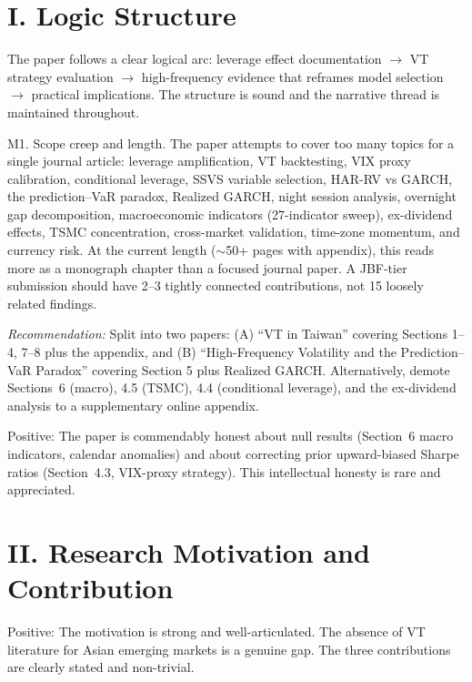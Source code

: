 \documentclass[12pt,a4paper]{article}
\begin{document}
\section*{I. Logic Structure}

The paper follows a clear logical arc: leverage effect documentation $\to$ VT strategy evaluation $\to$ high-frequency evidence that reframes model selection $\to$ practical implications. The structure is sound and the narrative thread is maintained throughout.

\textcolor{warncolor}{M1. Scope creep and length.} The paper attempts to cover too many topics for a single journal article: leverage amplification, VT backtesting, VIX proxy calibration, conditional leverage, SSVS variable selection, HAR-RV vs GARCH, the prediction--VaR paradox, Realized GARCH, night session analysis, overnight gap decomposition, macroeconomic indicators (27-indicator sweep), ex-dividend effects, TSMC concentration, cross-market validation, time-zone momentum, and currency risk. At the current length ($\sim$50+ pages with appendix), this reads more as a monograph chapter than a focused journal paper. A JBF-tier submission should have 2--3 tightly connected contributions, not 15 loosely related findings.

\textit{Recommendation:} Split into two papers: (A) ``VT in Taiwan'' covering Sections 1--4, 7--8 plus the appendix, and (B) ``High-Frequency Volatility and the Prediction--VaR Paradox'' covering Section 5 plus Realized GARCH. Alternatively, demote Sections~6 (macro), 4.5 (TSMC), 4.4 (conditional leverage), and the ex-dividend analysis to a supplementary online appendix.

\textcolor{okgreen}{Positive:} The paper is commendably honest about null results (Section~6 macro indicators, calendar anomalies) and about correcting prior upward-biased Sharpe ratios (Section~4.3, VIX-proxy strategy). This intellectual honesty is rare and appreciated.


\section*{II. Research Motivation and Contribution}

\textcolor{okgreen}{Positive:} The motivation is strong and well-articulated. The absence of VT literature for Asian emerging markets is a genuine gap. The three contributions are clearly stated and non-trivial.
\end{document}
